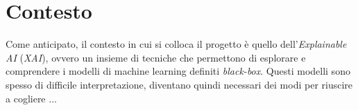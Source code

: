 \chapter{Contesto}

Come anticipato, il contesto in cui si colloca il progetto è quello
dell'\textit{Explainable AI} (\textit{XAI}), ovvero un insieme di tecniche che
permettono di esplorare e comprendere i modelli di machine learning definiti
\textit{black-box}. Questi modelli sono spesso di difficile interpretazione,
diventano quindi necessari dei modi per riuscire a cogliere ...